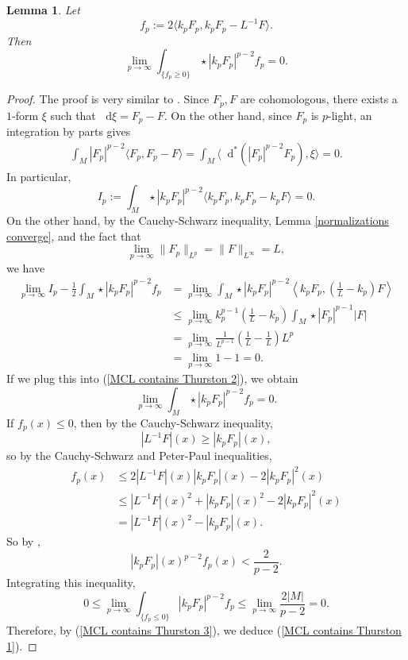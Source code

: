\documentclass[reqno,11pt]{amsart}
\newcommand*\dif{\mathop{}\!\mathrm{d}}
\newtheorem{lemma}[theorem]{Lemma}
\theoremstyle{definition}
\numberwithin{equation}{section}
\begin{document}
\begin{lemma}
Let
$$f_p := 2\langle k_p F_p, k_p F_p - L^{-1} F\rangle.$$
Then 
\begin{equation}\label{MCL contains Thurston 1}
	\lim_{p \to \infty} \int_{\{f_p \geq 0\}} \star |k_p F_p|^{p - 2} f_p = 0.
\end{equation}
\end{lemma}
\begin{proof}
The proof is very similar to \cite[Lemma 6.3]{daskalopoulos2020transverse}.
Since $F_p, F$ are cohomologous, there exists a $1$-form $\xi$ such that $\dif \xi = F_p - F$.
On the other hand, since $F_p$ is $p$-light, an integration by parts gives
\begin{align*}
\int_M |F_p|^{p - 2} \langle F_p, F_p - F \rangle = \int_M \langle \dif^*(|F_p|^{p - 2} F_p), \xi\rangle = 0.
\end{align*}
In particular,
\begin{equation}\label{MCL contains Thurston 2}
	I_p := \int_M \star |k_p F_p|^{p - 2} \langle k_p F_p, k_p F_p - k_p F\rangle = 0.
\end{equation}
On the other hand, by the Cauchy-Schwarz inequality, Lemma \ref{normalizations converge}, and the fact that 
$$\lim_{p \to \infty} \|F_p\|_{L^p} = \|F\|_{L^\infty} = L,$$
we have
\begin{align*}
\lim_{p \to \infty} I_p - \frac{1}{2} \int_M \star |k_p F_p|^{p - 2} f_p 
&= \lim_{p \to \infty} \int_M \star |k_p F_p|^{p - 2} \left\langle k_p F_p, \left(\frac{1}{L} - k_p\right) F\right\rangle \\
&\leq \lim_{p \to \infty} k_p^{p - 1} \left(\frac{1}{L} - k_p\right) \int_M \star |F_p|^{p - 1} |F| \\
&= \lim_{p \to \infty} \frac{1}{L^{p - 1}} \left(\frac{1}{L} - \frac{1}{L}\right)L^p \\
&= \lim_{p \to \infty} 1 - 1 = 0.
\end{align*}
If we plug this into (\ref{MCL contains Thurston 2}), we obtain 
\begin{equation}\label{MCL contains Thurston 3}
	\lim_{p \to \infty} \int_M \star |k_p F_p|^{p - 2} f_p = 0.
\end{equation}
If $f_p(x) \leq 0$, then by the Cauchy-Schwarz inequality,
$$|L^{-1} F|(x) \geq |k_p F_p|(x),$$
so by the Cauchy-Schwarz and Peter-Paul inequalities,
\begin{align*}
f_p(x) &\leq 2|L^{-1} F|(x) |k_p F_p|(x) - 2|k_p F_p|^2(x) \\
&\leq |L^{-1} F|(x)^2 + |k_p F_p|(x)^2 - 2|k_p F_p|^2(x) \\
&= |L^{-1} F|(x)^2 - |k_p F_p|(x).
\end{align*}
So by \cite[Lemma 6.2]{daskalopoulos2020transverse},
$$|k_p F_p|(x)^{p - 2} f_p(x) < \frac{2}{p - 2}.$$
Integrating this inequality, 
$$0 \leq \lim_{p \to \infty} \int_{\{f_p \leq 0\}} |k_p F_p|^{p - 2} f_p \leq \lim_{p \to \infty} \frac{2|M|}{p - 2} = 0.$$
Therefore, by (\ref{MCL contains Thurston 3}), we deduce (\ref{MCL contains Thurston 1}).
\end{proof}
\end{document}
